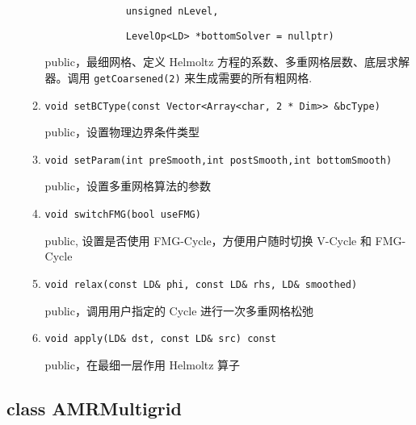 \documentclass[cn, bibend=bibtex]{elegantpaper}
\theoremstyle{plain}
\begin{document}
\begin{itemize}
\begin{enumerate}
    
    \lstinline|              unsigned nLevel, |
    
    \lstinline|              LevelOp<LD> *bottomSolver = nullptr)|

    public，最细网格、定义 Helmoltz 方程的系数、多重网格层数、底层求解器。调用 \lstinline|getCoarsened(2)|
    来生成需要的所有粗网格.

    \item \lstinline|void setBCType(const Vector<Array<char, 2 * Dim>> &bcType)|

    public，设置物理边界条件类型
    
    \item \lstinline|void setParam(int preSmooth,int postSmooth,int bottomSmooth)|

    public，设置多重网格算法的参数

    \item \lstinline|void switchFMG(bool useFMG)|

    public, 设置是否使用 FMG-Cycle，方便用户随时切换 V-Cycle 和 FMG-Cycle

    \item \lstinline|void relax(const LD& phi, const LD& rhs, LD& smoothed)|

    public，调用用户指定的 Cycle 进行一次多重网格松弛

    \item \lstinline|void apply(LD& dst, const LD& src) const|

    public，在最细一层作用 Helmoltz 算子
    \end{enumerate}

\end{itemize}

\subsection{class AMRMultigrid}
\end{document}
